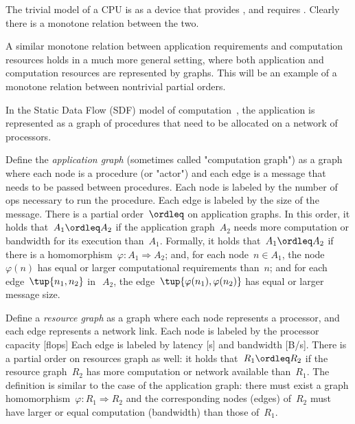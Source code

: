 The trivial model of a CPU is as a device that provides , and requires .
Clearly there is a monotone relation between the two.

\begin{figure}[h]
    \centering
    \caption{}
\end{figure}

A similar monotone relation between application requirements and computation resources holds in a much more general setting, where both application and computation resources are represented by graphs.
This will be an example of a monotone relation between nontrivial partial orders.

In the Static Data Flow (SDF) model of computation~\cite[Chapter 3]{sriram00,lee10}, the application is represented as a graph of procedures that need to be allocated on a network of processors.

\begin{figure}[h]
    \centering
    \caption{}
\end{figure}


Define the\emph{ application graph }(sometimes called "computation graph") as a graph where each node is a procedure (or "actor") and each edge is a message that needs to be passed between procedures.
Each node is labeled by the number of ops necessary to run the procedure.
Each edge is labeled by the size of the message.
There is a partial order~$\ordleq$ on application graphs.
In this order, it holds that~$A_1 \ordleq A_2$ if the application graph~$A_2$ needs more computation or bandwidth for its execution than~$A_1$.
Formally, it holds that~$A_1 \ordleq A_2$
if there is a homomorphism~$\varphi \colon A_1  \Rightarrow A_2$; and, for each node~$n \in A_1$, the node~$\varphi(n)$ has equal or larger computational requirements than~$n$; and for each edge~$\tup{n_1,n_2}$
in~$~A_2$, the edge~$\tup{\varphi (n_1), \varphi (n_2)}$ has equal or larger message size.


Define a \emph{resource graph} as a graph where each node represents a processor, and each edge represents a network link.
Each node is labeled by the processor capacity [flops] Each edge is labeled by latency [s] and bandwidth [B/s].
There is a partial order on resources graph as well: it holds that~$R_1 \ordleq R_2$ if the resource graph~$R_2$ has more computation or network available than~$R_1$.
The definition is similar to the case of the application graph: there must exist a graph homomorphism~$\varphi \colon R_1  \Rightarrow R_2$
and the corresponding nodes (edges) of~$R_2$ must have larger or equal computation (bandwidth) than those of~$R_1$.

